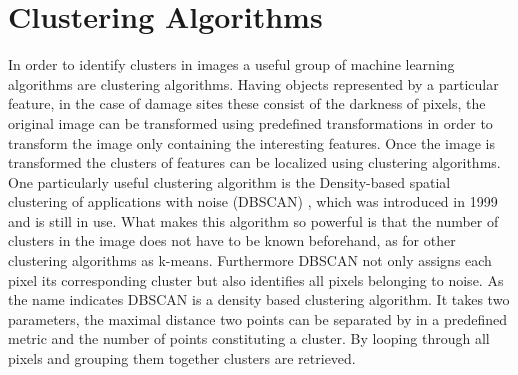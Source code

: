 \section{Clustering Algorithms}

\cite{Ester:1996:DAD:3001460.3001507}


In order to identify clusters in images a useful group of machine learning algorithms are clustering algorithms. Having objects represented by a particular feature, in the case of damage sites these consist of the darkness of pixels, the original image can be transformed using predefined transformations in order to transform the image only containing the interesting features. Once the image is transformed the clusters of features can be localized using clustering algorithms. One particularly useful clustering algorithm is the Density-based spatial clustering of applications with noise (DBSCAN) \cite{DBSCAN}, which was introduced in 1999 and is still in use. What makes this algorithm so powerful is that the number of clusters in the image does not have to be known beforehand, as for other clustering algorithms as k-means. Furthermore DBSCAN not only assigns each pixel its corresponding cluster but also identifies all pixels belonging to noise. As the name indicates DBSCAN is a density based clustering algorithm. It takes two parameters, the maximal distance two points can be separated by in a predefined metric and the number of points constituting a cluster. By looping through all pixels and grouping them together clusters are retrieved.


















